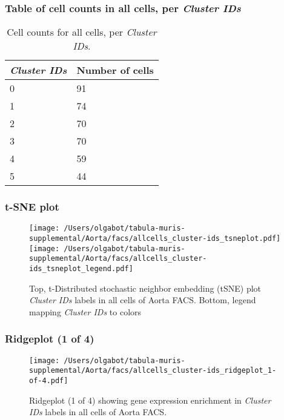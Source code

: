 \subsubsection{Table of cell counts in all cells, per \emph{Cluster IDs}}\begin{table}[h]
\centering
\label{my-label}
\begin{tabular}{@{}ll@{}}
\toprule

\emph{Cluster IDs}& Number of cells \\ \midrule
0 & 91 \\

1 & 74 \\

2 & 70 \\

3 & 70 \\

4 & 59 \\

5 & 44 \\
\bottomrule
\end{tabular}
\caption{Cell counts for all cells, per \emph{Cluster IDs}.}
\end{table}

\clearpage
\subsubsection{t-SNE plot}
\begin{figure}[h]
\centering
\texttt{[image: /Users/olgabot/tabula-muris-supplemental/Aorta/facs/allcells\_cluster-ids\_tsneplot.pdf]}
\texttt{[image: /Users/olgabot/tabula-muris-supplemental/Aorta/facs/allcells\_cluster-ids\_tsneplot\_legend.pdf]}
\caption{Top, t-Distributed stochastic neighbor embedding (tSNE) plot  \emph{Cluster IDs} labels in all cells of Aorta FACS. Bottom, legend mapping \emph{Cluster IDs} to colors}
\end{figure}


\clearpage

\subsubsection{Ridgeplot (1 of 4)}
\begin{figure}[h]
\centering
\texttt{[image: /Users/olgabot/tabula-muris-supplemental/Aorta/facs/allcells\_cluster-ids\_ridgeplot\_1-of-4.pdf]}

\caption{ Ridgeplot (1 of 4)  showing gene expression enrichment in \emph{Cluster IDs} labels in all cells of Aorta FACS. }
\end{figure}


